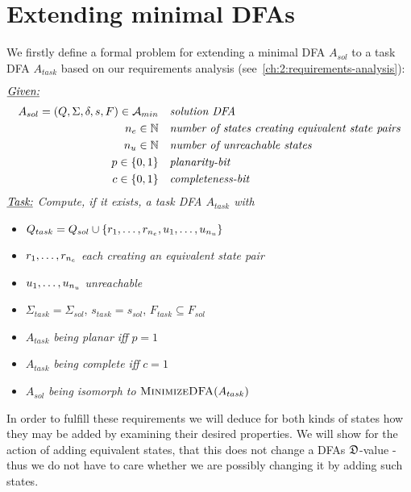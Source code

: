 
\chapter{Extending minimal DFAs} \label{ch:4}

We firstly define a formal problem for extending a minimal DFA $A_{sol}$ to a task DFA $A_{task}$ based on our requirements analysis (see~\ref{ch:2:requirements-analysis}):
\begin{definition}[ExtendMinimalDFA] $ $ \\
	$ $ \vspace{-0.cm} \\
	\noindent $\underline{\emph{Given:}}$
	\vspace{-0.2cm}
	\begin{align*}
	A_{sol} = (Q, \Sigma, \delta, s, F) \in {\mathcal{A}_{min}}\ \ \ & \emph{solution DFA} \\
	{n_e} \in \mathbb{N}\ \ \ & \emph{number of states creating equivalent state pairs} \\
	{n_u} \in \mathbb{N}\ \ \ & \emph{number of unreachable states} \\
	p \in \{0,1\}\ \ \ & \emph{planarity-bit} \\
	c \in \{0,1\}\ \ \ & \emph{completeness-bit}
	\end{align*}
	\noindent $\underline{\emph{Task:}}$ \emph{Compute, if it exists, a task DFA $A_{task}$ with}
	\begin{itemize}
		\item $Q_{task} = Q_{sol} \cup \{ r_1, \ldots, r_{n_e}, u_1, \ldots, u_{n_u} \}$
		\item $r_1, \ldots, r_{n_e}$ \emph{each creating an equivalent state pair}
		\item $u_1, \ldots, u_{n_u}$ \emph{unreachable}
		\item $\Sigma_{task} = \Sigma_{sol}$, $s_{task} = s_{sol}$, $F_{task} \subseteq F_{sol}$
		\item $A_{task}$ \emph{being planar iff} $p = 1$
		\item $A_{task}$ \emph{being complete iff} $c = 1$
		\item $A_{sol}$ \emph{being isomorph to} $\textsc{MinimizeDFA}(A_{task})$
	\end{itemize}
\end{definition}
\noindent In order to fulfill these requirements we will deduce for both kinds of states how they may be added by examining their desired properties. We will show for the action of adding equivalent states, that this does not change a DFAs $\mathfrak{D}$-value - thus we do not have to care whether we are possibly changing it by adding such states.


